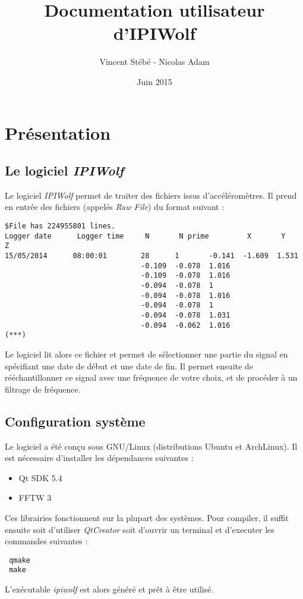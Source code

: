 \documentclass[a4paper,12pt]{article}
\begin{document}
\title{Documentation utilisateur d'IPIWolf}
\author{Vincent Stébé - Nicolas Adam}
\date{Juin 2015}

\maketitle

\newpage 
{}

\tableofcontents
\vspace{1cm}
\restoregeometry
\newpage

\section{Présentation}
\subsection{Le logiciel \emph{IPIWolf}}
Le logiciel \emph{IPIWolf} permet de traiter des fichiers issus d'accéléromètres.
Il prend en entrée des fichiers (appelés \emph{Raw File}) du format suivant :
\begin{verbatim}
$File has 224955801 lines.                                                                                                                            
Logger date      Logger time     N       N prime         X       Y       Z 
15/05/2014      08:00:01        28      1       -0.141  -1.609  1.531
                                -0.109  -0.078  1.016
                                -0.109  -0.078  1.016
                                -0.094  -0.078  1
                                -0.094  -0.078  1.016
                                -0.094  -0.078  1
                                -0.094  -0.078  1.031
                                -0.094  -0.062  1.016
(***)
\end{verbatim}
Le logiciel lit alors ce fichier et permet de sélectionner une partie du signal en spécifiant une date de début et une date de fin.
Il permet ensuite de rééchantillonner ce signal avec une fréquence de votre choix, et de procéder à un filtrage de fréquence.

\subsection{Configuration système}
Le logiciel a été conçu sous GNU/Linux (distributions Ubuntu et ArchLinux).
Il est nécessaire d'installer les dépendances suivantes :
\begin{itemize}
 \item Qt SDK 5.4
 \item FFTW 3
\end{itemize}
Ces librairies fonctionnent sur la plupart des systèmes.
Pour compiler, il suffit ensuite soit d'utiliser \emph{QtCreator} soit d'ouvrir un terminal et d'executer les commandes suivantes :
\begin{verbatim}
 qmake
 make
\end{verbatim}
L'exécutable \emph{ipiwolf} est alors généré et prêt à être utilisé.



\section{}
\end{document}
